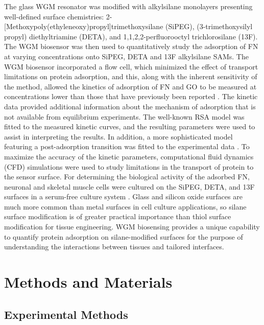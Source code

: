 The glass WGM resonator was modified with alkylsilane monolayers presenting
well-defined surface chemistries: 2-{[}Methoxypoly(ethyleneoxy)propyl{]}trimethoxysilane
(SiPEG), (3-trimethoxysilyl propyl) diethyltriamine (DETA), and 1,1,2,2-perfluorooctyl
trichlorosilane (13F). The WGM biosensor was then used to quantitatively
study the adsorption of FN at varying concentrations onto SiPEG, DETA
and 13F alkylsilane SAMs. The WGM biosensor incorporated a flow cell,
which minimized the effect of transport limitations on protein adsorption,
and this, along with the inherent sensitivity of the method, allowed
the kinetics of adsorption of FN and GO to be measured at concentrations
lower than those that have previously been reported \cite{Michael2003}.
The kinetic data provided additional information about the mechanism
of adsorption that is not available from equilibrium experiments.
The well-known RSA model \cite{Schaaf1989} was fitted to the measured
kinetic curves, and the resulting parameters were used to assist in
interpreting the results. In addition, a more sophisticated model
featuring a post-adsorption transition was fitted to the experimental
data \cite{Brusatori1999,Tie2003}. To maximize the accuracy of the
kinetic parameters, computational fluid dynamics (CFD) simulations
were used to study limitations in the transport of protein to the
sensor surface. For determining the biological activity of the adsorbed
FN, neuronal and skeletal muscle cells were cultured on the SiPEG,
DETA, and 13F surfaces in a serum-free culture system \cite{Brewer1995,Das2007}.
Glass and silicon oxide surfaces are much more common than metal surfaces
in cell culture applications, so silane surface modification is of
greater practical importance than thiol surface modification for tissue
engineering. WGM biosensing provides a unique capability to quantify
protein adsorption on silane-modified surfaces for the purpose of
understanding the interactions between tissues and tailored interfaces. 


\section{Methods and Materials}


\subsection{Experimental Methods}

